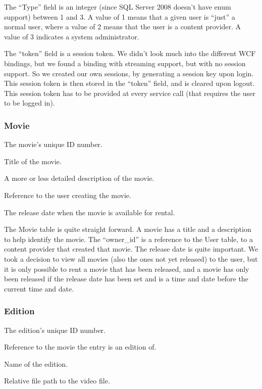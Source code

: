 The ``Type'' field is an integer (since SQL Server 2008 doesn't have enum support) between 1 and 3. A value of 1 means that a given user is ``just'' a normal user, where a value of 2 means that the user is a content provider. A value of 3 indicates a system administrator.

The ``token'' field is a session token. We didn't look much into the different WCF bindings, but we found a binding with streaming support, but with no session support. So we created our own sessions, by generating a session key upon login. This session token is then stored in the ``token'' field, and is cleared upon logout. This session token has to be provided at every service call (that requires the user to be logged in).

\subsubsection{Movie}
\label{Design_Database_Tables_Movie}

\begin{my_description}
\item[movie\_id] The movie's unique ID number.
\item[title] Title of the movie.
\item[description] A more or less detailed description of the movie.
\item[owner\_id] Reference to the user creating the movie.
\item[release\_date] The release date when the movie is available for rental.
\end{my_description}

The Movie table is quite straight forward. A movie has a title and a description to help identify the movie. The ``owner\_id'' is a reference to the User table, to a content provider that created that movie. The release date is quite important. We took a decision to view all movies (also the ones not yet released) to the user, but it is only possible to rent a movie that has been released, and a movie has only been released if the release date has been set and is a time and date before the current time and date.

\subsubsection{Edition}
\label{Design_Database_Tables_Edition}

\begin{my_description}
\item[edition\_id] The edition's unique ID number.
\item[movie\_id] Reference to the movie the entry is an edition of.
\item[name] Name of the edition.
\item[file\_path] Relative file path to the video file.
\end{my_description}

